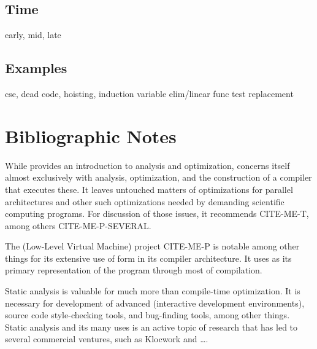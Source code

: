 \subsection{Time}
early, mid, late

\subsection{Examples}
cse, dead code, hoisting, induction variable elim/linear func test replacement

\section{Bibliographic Notes}
While \citet[chapters~8--10]{Cooper:Engineering:2004} provides an introduction to analysis and optimization, \citet{Muchnick:Advanced:1997} concerns itself almost exclusively with analysis, optimization, and the construction of a compiler that executes these. It leaves untouched matters of optimizations for parallel architectures and other such optimizations needed by demanding scientific computing programs. For discussion of those issues, it recommends CITE-ME-T, among others CITE-ME-P-SEVERAL.

The  (Low-Level Virtual Machine) project CITE-ME-P is notable among other things for its extensive use of \SSA form in its compiler architecture. It uses \SSA as its primary representation of the program through most of compilation.

Static analysis is valuable for much more than compile-time optimization. It is necessary for development of advanced  (interactive development environments), source code style-checking tools, and bug-finding tools, among other things. Static analysis and its many uses is an active topic of research that has led to several commercial ventures, such as Klocwork and \dots.%
